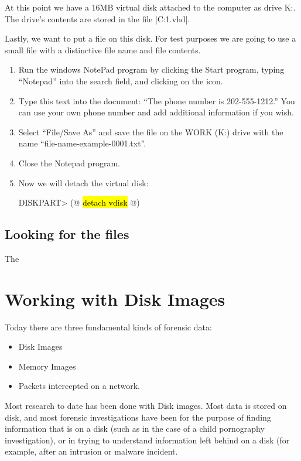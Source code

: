 At this point we have a 16MB virtual disk attached to the computer as
drive K:. The drive's contents are stored in the file |C:\disk1.vhd|.

Lastly, we want to put a file on this disk. For test purposes we are
going to use a small file with a distinctive file name and file
contents.

\begin{enumerate}[resume]
\item Run the windows NotePad program by clicking the Start program,
typing ``Notepad'' into the search field, and clicking on the icon.

\item Type this text into the document:  ``The phone number is
202-555-1212.'' You can use your own phone number and add additional
information if you wish.

\item Select ``File/Save As'' and save the file on the WORK (K:) drive
with the name ``file-name-example-0001.txt''. 

\item Close the Notepad program.

\item Now we will detach the virtual disk:

\begin{code}
DISKPART> (@ \hl{detach vdisk} @)
\end{code}

\end{enumerate}

\subsection{Looking for the files}
The 

\section{Working with Disk Images}

Today there are three fundamental kinds of forensic data:

\begin{itemize}
\item Disk Images
\item Memory Images
\item Packets intercepted on a network.
\end{itemize}

Most research to date has been done with Disk images. Most data is
stored on disk, and most forensic investigations have been for the
purpose of finding information that is on a disk (such as in the case
of a child pornography investigation), or in trying to understand
information left behind on a disk (for example, after an intrusion or
malware incident.

